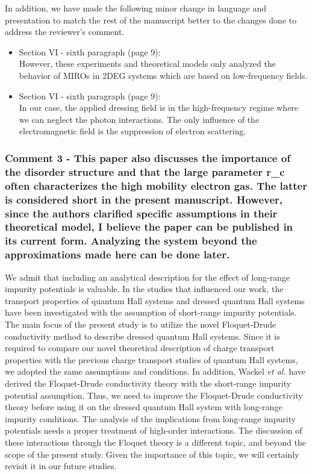 \documentclass{article}
\begin{document}
In addition, we have made the following minor change in language and presentation to match the rest of the manuscript better to the changes done to address the reviewer’s comment.

\begin{itemize}
  \item Section VI - sixth paragraph (page 9):\\
  {\color{Red}
  However, these experiments and theoretical models only analyzed the behavior of MIROs in 2DEG systems which are based on low-frequency fields.
  }
  \item Section VI - sixth paragraph (page 9):\\
  {\color{Red} In our case, the applied dressing field is in the high-frequency regime where we can neglect the photon interactions. The only influence of the electromagnetic field is the suppression of electron scattering.}
\end{itemize}


\subsubsection*{Comment 3 -
\color{RoyalBlue} This paper also discusses the importance of the disorder structure and that the large parameter r\_c often characterizes the high mobility electron gas. The latter is considered short in the present manuscript. However, since the authors clarified specific assumptions in their theoretical model, I believe the paper can be published in its current form. Analyzing the system beyond the approximations made here can be done later.}

We admit that including an analytical description for the effect of long-range impurity potentials is valuable. In the studies \cite{dini16,endo09} that influenced our work, the transport properties of quantum Hall systems and dressed quantum Hall systems have been investigated with the assumption of short-range impurity potentials.
The main focus of the present study is to utilize the novel Floquet-Drude conductivity method \cite{wackerl20,wackerlthesis20} to describe dressed quantum Hall systems. Since it is required to compare our novel theoretical description of charge transport properties with the previous charge transport studies \cite{dini16,endo09} of quantum Hall systems, we adopted the same assumptions and conditions. In addition, Wackel \textit{et al.} \cite{wackerl20} have derived the Floquet-Drude conductivity theory with the short-range impurity potential assumption.  Thus, we need to improve the Floquet-Drude conductivity theory before using it on the dressed quantum Hall system with long-range impurity conditions. The analysis of the implications from long-range impurity potentials needs a proper treatment of high-order interactions.
The discussion of these interactions through the Floquet theory is a different topic, and beyond the scope of the present study. Given the importance of this topic, we will certainly revisit it in our future studies.
\end{document}
